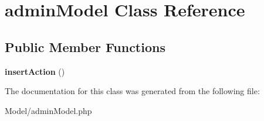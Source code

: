 \hypertarget{classadmin_model}{\section{admin\-Model Class Reference}
\label{classadmin_model}
}
\subsection*{Public Member Functions}
\begin{DoxyCompactItemize}
\item 
\hypertarget{classadmin_model_a1b9b2f16dd4b8a16a202a62cbb5d5a6b}{{\bfseries insert\-Action} ()}\label{classadmin_model_a1b9b2f16dd4b8a16a202a62cbb5d5a6b}

\end{DoxyCompactItemize}


The documentation for this class was generated from the following file\-:\begin{DoxyCompactItemize}
\item 
Model/admin\-Model.\-php\end{DoxyCompactItemize}
